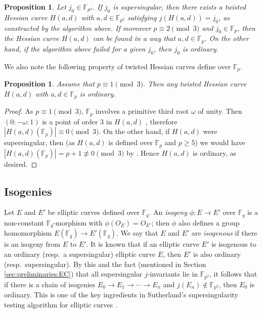\documentclass{article}
\newtheorem{proposition}[theorem]{Proposition}
\theoremstyle{definition}
\newcommand{\FF}{\mathbb{F}}
\begin{document}
\begin{proposition}
\label{prop:from_Weierstrass_to_Hesse}
Let $j_0 \in \FF_{p^2}$.
If $j_0$ is supersingular, then there exists a twisted Hessian curve $H(a,d)$ with $a,d \in \FF_{p^2}$ satisfying $j(H(a,d)) = j_0$, as constructed by the algorithm above.
If moreover $p \equiv 2 \pmod{3}$ and $j_0 \in \FF_p$, then the Hessian curve $H(a,d)$ can be found in a way that $a,d \in \FF_p$.
On the other hand, if the algorithm above failed for a given $j_0$, then $j_0$ is ordinary. 
\end{proposition}

We also note the following property of twisted Hessian curves define over $\FF_p$.

\begin{proposition}
\label{prop:ordinary_if_1_mod_3}
Assume that $p \equiv 1 \pmod{3}$.
Then any twisted Hessian curve $H(a,d)$ with $a,d \in \FF_p$ is ordinary.
\end{proposition}
\begin{proof}
As $p \equiv 1 \pmod{3}$, $\FF_p$ involves a primitive third root $\omega$ of unity.
Then $(0:-\omega:1)$ is a point of order $3$ in $H(a,d)$ \cite[Theorem 5.1]{LC:BCKL15}, therefore $|H(a,d)(\FF_p)| \equiv 0 \pmod{3}$.
On the other hand, if $H(a,d)$ were supersingular, then (as $H(a,d)$ is defined over $\FF_p$ and $p \geq 5$) we would have $|H(a,d)(\FF_p)| = p + 1 \not\equiv 0 \pmod{3}$ by \cite[Exercise V.5.10]{Silverman:AEC}.
Hence $H(a,d)$ is ordinary, as desired.
\end{proof}


\subsection{Isogenies}
\label{sec:preliminaries:isogeny}

Let $E$ and $E'$ be elliptic curves defined over $\FF_q$.
An \emph{isogeny} $\phi \colon E \to E'$ over $\FF_q$ is a non-constant $\FF_q$-morphism with $\phi(O_E) = O_{E'}$; then $\phi$ also defines a group homomorphism $E(\FF_q) \to E'(\FF_q)$.
We say that $E$ and $E'$ are \emph{isogenous} if there is an isogeny from $E$ to $E'$.
It is known that if an elliptic curve $E'$ is isogenous to an ordinary (resp.\ a supersingular) elliptic curve $E$, then $E'$ is also ordinary (resp.\ supersingular).
By this and the fact (mentioned in Section \ref{sec:preliminaries:EC}) that all supersingular $j$-invariants lie in $\FF_{p^2}$, it follows that if there is a chain of isogenies $E_0 \to E_1 \to \cdots \to E_n$ and $j(E_n) \not\in \FF_{p^2}$, then $E_0$ is ordinary.
This is one of the key ingredients in Sutherland's supersingularity testing algorithm for elliptic curves \cite{DBLP:journals/lmsjcm/Sutherland12a}.
\end{document}
